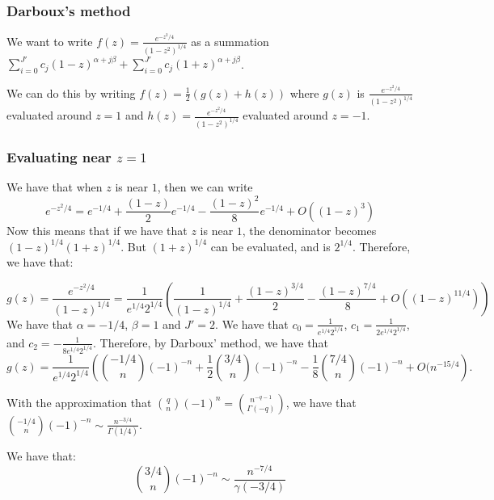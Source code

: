 \documentclass[]{article}
\begin{document}
\subsubsection{Darboux's method}

We want to write $f(z) =\frac{e^{-z^2/4}}{(1 - z^2)^{1/4}}$ as a summation $\sum_{i = 0}^{J'} c_j (1 - z)^{\alpha + j \beta} + \sum_{i = 0}^{J'} c_j (1 + z)^{\alpha + j \beta}$.

We can do this by writing $f(z) = \frac{1}{2}(g(z) + h(z))$ where $g(z)$ is $\frac{e^{-z^2/4}}{(1 - z^2)^{1/4}}$ evaluated around $z = 1$ and $h(z) = \frac{e^{-z^2/4}}{(1 - z^2)^{1/4}}$ evaluated around $z = -1$.

\subsubsection{Evaluating near $z = 1$}
 We have that when $z$ is near $1$, then we can write
\begin{equation}
	e^{-z^2/4} = e^{-1/4} + \frac{(1-z)}{2} e^{-1/4}  - \frac{(1 - z)^2}{8} e^{-1/4} + O((1 - z)^3)
\end{equation}
Now this means that if we have that $z$ is near $1$, the denominator becomes $(1 - z)^{1/4} (1 + z)^{1/4}$. But $(1 + z)^{1/4}$ can be evaluated, and is $2^{1/4}$. Therefore, we have that:

\begin{equation}
	g(z) = \frac{e^{-z^2/4}}{(1 - z)^{1/4}} = \frac{1}{e^{1/4} 2^{1/4}} \left(\frac{1}{(1 - z)^{1/4}} + \frac{(1 - z)^{3/4}}{2} - \frac{(1 - z)^{7/4}}{8} +  O((1 - z)^{11/4})\right)
\end{equation}
We have that $\alpha = -1/4$, $\beta = 1$ and $J' = 2$. We have that $c_0 = \frac{1}{e^{1/4} 2^{1/4}}$, $c_1 = \frac{1}{2 e^{1/4} 2^{1/4}}$, and $c_2 = -\frac{1}{8 e^{1/4} 2^{1/4}}$.
Therefore, by Darboux' method, we have that 
\begin{equation}
	[z^n]g(z) = \frac{1}{e^{1/4} 2^{1/4}} \left( \binom{-1/4}{n}(-1)^{-n} +  \frac{1}{2}\binom{3/4}{n}(-1)^{-n} - \frac{1}{8} \binom{7/4}{n} (-1)^{-n} + O(n^{-15/4} \right).
\end{equation}

With the approximation that $\binom{q}{n}(-1)^n = \binom{n^{-q - 1}}{\Gamma(-q)}$, we have that $\binom{-1/4}{n}(-1)^{-n} \sim \frac{n^{-3/4}}{\Gamma(1/4)}$.

We have that:
\begin{equation}
	\binom{3/4}{n}(-1)^{-n} \sim \frac{n^{-7/4}}{\gamma(-3/4)}
\end{equation}
\end{document}
